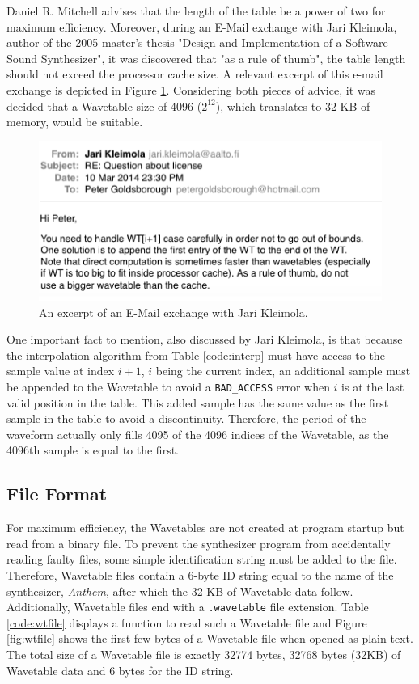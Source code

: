 \noindent Daniel R. Mitchell advises that the length of the table be a power of two for maximum efficiency.  Moreover, during an E-Mail exchange with Jari Kleimola, author of the 2005 master's thesis "Design and Implementation of a Software Sound Synthesizer", it was discovered that "as a rule of thumb", the table length should not exceed the processor cache size. A relevant excerpt of this e-mail exchange is depicted in Figure \ref{fig:jari}. Considering both pieces of advice, it was decided that a Wavetable size of 4096 ($2^{12}$), which translates to 32 KB of memory, would be suitable.

\begin{figure}
  \includegraphics[scale=0.7]{img/jari}
  \caption{An excerpt of an E-Mail exchange with Jari Kleimola.}
  \label{fig:jari}
\end{figure}

\noindent One important fact to mention, also discussed by Jari Kleimola, is that because the interpolation algorithm from Table \ref{code:interp} must have access to the sample value at index $i+1$, $i$ being the current index, an additional sample must be appended to the Wavetable to avoid a \texttt{BAD\_ACCESS} error when $i$ is at the last valid position in the table. This added sample has the same value as the first sample in the table to avoid a discontinuity. Therefore, the period of the waveform actually only fills 4095 of the 4096 indices of the Wavetable, as the 4096th sample is equal to the first.

\subsection{File Format}

For maximum efficiency, the Wavetables are not created at program startup but read from a binary file. To prevent the synthesizer program from accidentally reading faulty files, some simple identification string must be added to the file. Therefore, Wavetable files contain a 6-byte ID string equal to the name of the synthesizer, \emph{Anthem}, after which the 32 KB of Wavetable data follow. Additionally, Wavetable files end with a \texttt{.wavetable} file extension. Table \ref{code:wtfile} displays a function to read such a Wavetable file and Figure \ref{fig:wtfile} shows the first few bytes of a Wavetable file when opened as plain-text. The total size of a Wavetable file is exactly 32774 bytes, 32768 bytes (32KB) of Wavetable data and 6 bytes for the ID string.

